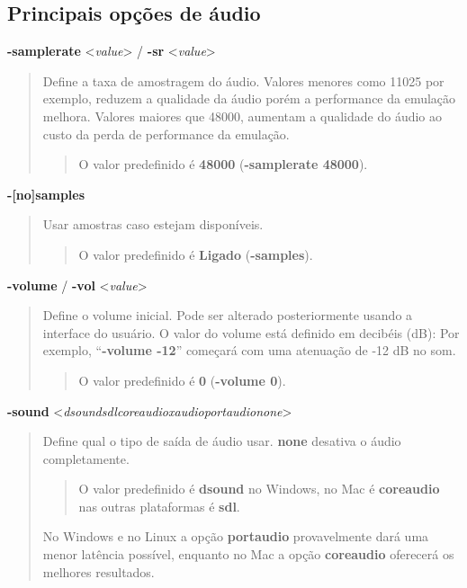 \documentclass[letterpaper,10pt,brazil]{sphinxmanual}
\begin{document}
\subsection{Principais opções de áudio}
\label{commandline/commandline-all:principais-opcoes-de-audio}\label{commandline/commandline-all:mame-commandline-samplerate}
\textbf{-samplerate} \textless{}\emph{value}\textgreater{} / \textbf{-sr} \textless{}\emph{value}\textgreater{}
\begin{quote}

Define a taxa de amostragem do áudio. Valores menores como 11025 por
exemplo, reduzem a qualidade da áudio porém a performance da
emulação melhora.
Valores maiores que 48000, aumentam a qualidade do áudio ao custo da
perda de performance da emulação.
\begin{quote}

O valor predefinido é \textbf{48000} (\textbf{-samplerate 48000}).
\end{quote}
\end{quote}
\label{commandline/commandline-all:mame-commandline-nosamples}
\textbf{-{[}no{]}samples}
\begin{quote}

Usar amostras caso estejam disponíveis.
\begin{quote}

O valor predefinido é \textbf{Ligado} (\textbf{-samples}).
\end{quote}
\end{quote}
\label{commandline/commandline-all:mame-commandline-volume}
\textbf{-volume} / \textbf{-vol} \textless{}\emph{value}\textgreater{}
\begin{quote}

Define o volume inicial. Pode ser alterado posteriormente usando
a interface do usuário.
O valor do volume está definido em decibéis (dB): Por exemplo,
``\textbf{-volume -12}'' começará com uma atenuação de -12 dB no som.
\begin{quote}

O valor predefinido é \textbf{0} (\textbf{-volume 0}).
\end{quote}
\end{quote}
\label{commandline/commandline-all:mame-commandline-sound}
\textbf{-sound} \textless{}\emph{dsound\textbar{}sdl\textbar{}coreaudio\textbar{}xaudio\textbar{}portaudio\textbar{}none}\textgreater{}
\begin{quote}

Define qual o tipo de saída de áudio usar. \textbf{none} desativa o áudio
completamente.
\begin{quote}

O valor predefinido é \textbf{dsound} no Windows, no Mac é
\textbf{coreaudio} nas outras plataformas é \textbf{sdl}.
\end{quote}

No Windows e no Linux a opção \textbf{portaudio} provavelmente dará uma
menor latência possível, enquanto no Mac a opção \textbf{coreaudio}
oferecerá os melhores resultados.
\end{quote}
\end{document}

